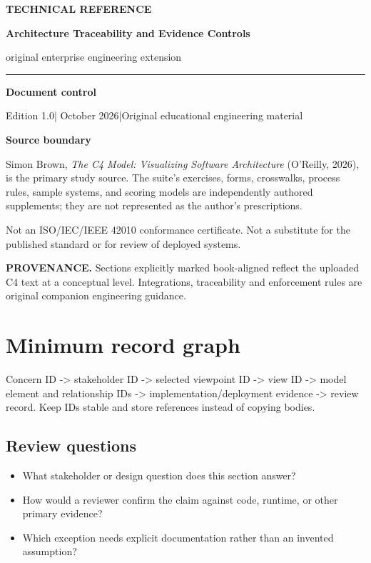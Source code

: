 \documentclass[10pt,letterpaper]{article}
\newcommand{\SourceNote}[1]{\par\smallskip\noindent\colorbox{C4Light}{\parbox{0.94\linewidth}{\footnotesize\textbf{PROVENANCE.} #1}}\par\medskip}
\newcommand{\DocStart}[3]{%
\begin{document}
\begin{titlepage}
\renewcommand{\thepage}{title-\arabic{page}}
\vspace*{0.55in}
{\sffamily\bfseries\small\color{C4Teal}#1}\par\vspace{0.24in}
{\sffamily\bfseries\fontsize{26}{31}\selectfont\color{C4Navy}#2}\par\vspace{0.18in}
{\large\color{C4Gray}#3}\par\vspace{0.4in}
\textcolor{C4Teal}{\rule{\linewidth}{1.15pt}}\par\vspace{0.24in}
\textbf{Document control}\par
Edition 1.0\quad|\quad 30 October 2026\quad|\quad Original educational engineering material\par
\vspace{0.17in}
\textbf{Source boundary}\par
Simon Brown, \emph{The C4 Model: Visualizing Software Architecture} (O'Reilly, 2026), is the primary study source. The suite's exercises, forms, crosswalks, process rules, sample systems, and scoring models are independently authored supplements; they are not represented as the author's prescriptions.\par
\vfill
{\small\color{C4Gray}Not an ISO/IEC/IEEE 42010 conformance certificate. Not a substitute for the published standard or for review of deployed systems.}\par
\end{titlepage}
}
\DocStart{TECHNICAL REFERENCE}{Architecture Traceability and Evidence Controls}{original enterprise engineering extension}
\tableofcontents\clearpage
\SourceNote{Sections explicitly marked book-aligned reflect the uploaded C4 text at a conceptual level. Integrations, traceability and enforcement rules are original companion engineering guidance.}
\section{Minimum record graph}
Concern ID -> stakeholder ID -> selected viewpoint ID -> view ID -> model element and relationship IDs -> implementation/deployment evidence -> review record. Keep IDs stable and store references instead of copying bodies.


\subsection{Review questions}
\begin{itemize}
\item What stakeholder or design question does this section answer?
\item How would a reviewer confirm the claim against code, runtime, or other primary evidence?
\item Which exception needs explicit documentation rather than an invented assumption?
\end{itemize}
\end{document}
